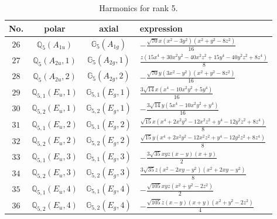 \documentclass[fleqn,8pt,landscape]{jsarticle}
\begin{document}
\begin{table}[ht!]
\begin{center}
\caption{Harmonics for rank 5.}
\renewcommand{\arraystretch}{1.3}
\begin{tabular}{cccl} \hline \hline
No. & polar & axial & expression \\ \hline
$ 26 $ & $ \mathbb{Q}_{5}(A_{1u}) $ & $ \mathbb{G}_{5}(A_{1g}) $ & $ - \frac{\sqrt{70} x \left(x^{2} - 3 y^{2}\right) \left(x^{2} + y^{2} - 8 z^{2}\right)}{16} $ \\
$ 27 $ & $ \mathbb{Q}_{5}(A_{2u},1) $ & $ \mathbb{G}_{5}(A_{2g},1) $ & $ \frac{z \left(15 x^{4} + 30 x^{2} y^{2} - 40 x^{2} z^{2} + 15 y^{4} - 40 y^{2} z^{2} + 8 z^{4}\right)}{8} $ \\
$ 28 $ & $ \mathbb{Q}_{5}(A_{2u},2) $ & $ \mathbb{G}_{5}(A_{2g},2) $ & $ - \frac{\sqrt{70} y \left(3 x^{2} - y^{2}\right) \left(x^{2} + y^{2} - 8 z^{2}\right)}{16} $ \\
$ 29 $ & $ \mathbb{Q}_{5,1}(E_{u},1) $ & $ \mathbb{G}_{5,1}(E_{g},1) $ & $ \frac{3 \sqrt{14} x \left(x^{4} - 10 x^{2} y^{2} + 5 y^{4}\right)}{16} $ \\
$ 30 $ & $ \mathbb{Q}_{5,2}(E_{u},1) $ & $ \mathbb{G}_{5,2}(E_{g},1) $ & $ - \frac{3 \sqrt{14} y \left(5 x^{4} - 10 x^{2} y^{2} + y^{4}\right)}{16} $ \\
$ 31 $ & $ \mathbb{Q}_{5,1}(E_{u},2) $ & $ \mathbb{G}_{5,1}(E_{g},2) $ & $ \frac{\sqrt{15} x \left(x^{4} + 2 x^{2} y^{2} - 12 x^{2} z^{2} + y^{4} - 12 y^{2} z^{2} + 8 z^{4}\right)}{8} $ \\
$ 32 $ & $ \mathbb{Q}_{5,2}(E_{u},2) $ & $ \mathbb{G}_{5,2}(E_{g},2) $ & $ \frac{\sqrt{15} y \left(x^{4} + 2 x^{2} y^{2} - 12 x^{2} z^{2} + y^{4} - 12 y^{2} z^{2} + 8 z^{4}\right)}{8} $ \\
$ 33 $ & $ \mathbb{Q}_{5,1}(E_{u},3) $ & $ \mathbb{G}_{5,1}(E_{g},3) $ & $ - \frac{3 \sqrt{35} x y z \left(x - y\right) \left(x + y\right)}{2} $ \\
$ 34 $ & $ \mathbb{Q}_{5,2}(E_{u},3) $ & $ \mathbb{G}_{5,2}(E_{g},3) $ & $ \frac{3 \sqrt{35} z \left(x^{2} - 2 x y - y^{2}\right) \left(x^{2} + 2 x y - y^{2}\right)}{8} $ \\
$ 35 $ & $ \mathbb{Q}_{5,1}(E_{u},4) $ & $ \mathbb{G}_{5,1}(E_{g},4) $ & $ - \frac{\sqrt{105} x y z \left(x^{2} + y^{2} - 2 z^{2}\right)}{2} $ \\
$ 36 $ & $ \mathbb{Q}_{5,2}(E_{u},4) $ & $ \mathbb{G}_{5,2}(E_{g},4) $ & $ - \frac{\sqrt{105} z \left(x - y\right) \left(x + y\right) \left(x^{2} + y^{2} - 2 z^{2}\right)}{4} $ \\
 \hline \hline
\end{tabular}
\end{center}
\end{table}
\end{document}
